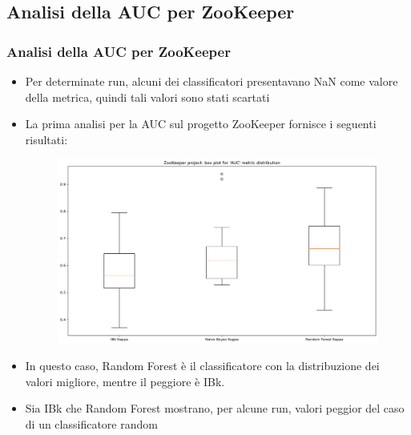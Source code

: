 \documentclass[10pt]{beamer}
\begin{document}
\begin{frame}
\section{Analisi della AUC per ZooKeeper}
\frametitle{Analisi della AUC per ZooKeeper}
\begin{itemize}
\item Per determinate run, alcuni dei classificatori presentavano NaN come valore della metrica, quindi tali valori sono stati scartati
\item La prima analisi per la AUC sul progetto ZooKeeper fornisce i seguenti risultati:
\begin{figure}
\includegraphics[scale=0.25]{images/auc_base_zk}
\end{figure}
\item In questo caso, Random Forest è il classificatore con la distribuzione dei valori migliore, mentre il peggiore è IBk.
\item Sia IBk che Random Forest mostrano, per alcune run, valori peggior del caso di un classificatore random
\end{itemize}
\end{frame}
\end{document}
